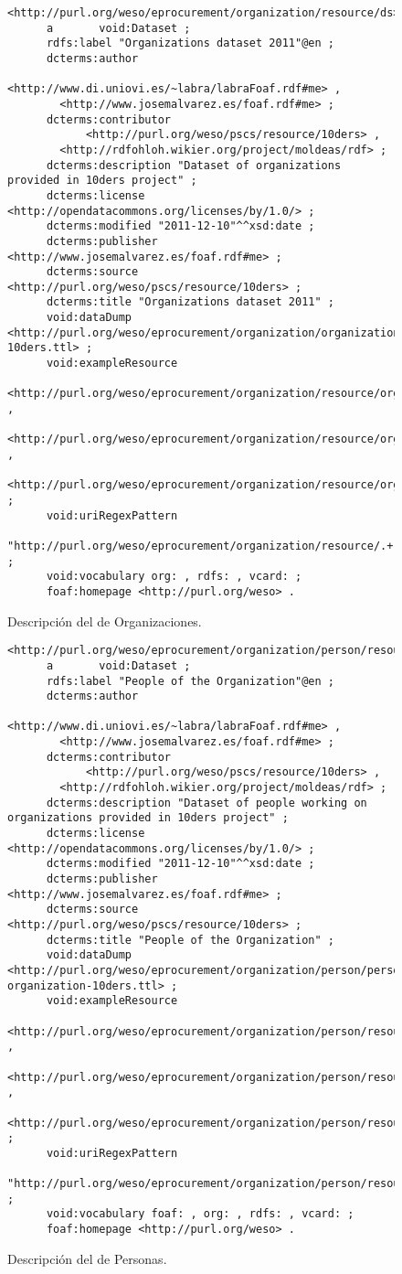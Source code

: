 \begin{figure}[!htp]
\begin{lstlisting} 
<http://purl.org/weso/eprocurement/organization/resource/ds>
      a       void:Dataset ;
      rdfs:label "Organizations dataset 2011"@en ;
      dcterms:author 
            <http://www.di.uniovi.es/~labra/labraFoaf.rdf#me> , 
	    <http://www.josemalvarez.es/foaf.rdf#me> ;
      dcterms:contributor
            <http://purl.org/weso/pscs/resource/10ders> ,
	    <http://rdfohloh.wikier.org/project/moldeas/rdf> ;
      dcterms:description "Dataset of organizations provided in 10ders project" ;
      dcterms:license <http://opendatacommons.org/licenses/by/1.0/> ;
      dcterms:modified "2011-12-10"^^xsd:date ;
      dcterms:publisher <http://www.josemalvarez.es/foaf.rdf#me> ;
      dcterms:source <http://purl.org/weso/pscs/resource/10ders> ;
      dcterms:title "Organizations dataset 2011" ;
      void:dataDump <http://purl.org/weso/eprocurement/organization/organization-10ders.ttl> ;
      void:exampleResource
        <http://purl.org/weso/eprocurement/organization/resource/org1> , 
	<http://purl.org/weso/eprocurement/organization/resource/org2> , 
	<http://purl.org/weso/eprocurement/organization/resource/org3> ;
      void:uriRegexPattern
        "http://purl.org/weso/eprocurement/organization/resource/.+" ;
      void:vocabulary org: , rdfs: , vcard: ;
      foaf:homepage <http://purl.org/weso> .
\end{lstlisting}
	\caption{Descripción del \dataset de Organizaciones.}
	\label{fig:orgs-ds}
\end{figure}
\begin{figure}[!htp]
\begin{lstlisting} 
<http://purl.org/weso/eprocurement/organization/person/resource/ds>
      a       void:Dataset ;
      rdfs:label "People of the Organization"@en ;
      dcterms:author 
            <http://www.di.uniovi.es/~labra/labraFoaf.rdf#me> , 
	    <http://www.josemalvarez.es/foaf.rdf#me> ;
      dcterms:contributor
            <http://purl.org/weso/pscs/resource/10ders> ,
	    <http://rdfohloh.wikier.org/project/moldeas/rdf> ;
      dcterms:description "Dataset of people working on organizations provided in 10ders project" ;
      dcterms:license <http://opendatacommons.org/licenses/by/1.0/> ;
      dcterms:modified "2011-12-10"^^xsd:date ;
      dcterms:publisher <http://www.josemalvarez.es/foaf.rdf#me> ;
      dcterms:source <http://purl.org/weso/pscs/resource/10ders> ;
      dcterms:title "People of the Organization" ;
      void:dataDump <http://purl.org/weso/eprocurement/organization/person/person-organization-10ders.ttl> ;
      void:exampleResource
        <http://purl.org/weso/eprocurement/organization/person/resource/p1> , 
	<http://purl.org/weso/eprocurement/organization/person/resource/p2> , 
	<http://purl.org/weso/eprocurement/organization/person/resource/p3> ;
      void:uriRegexPattern
        "http://purl.org/weso/eprocurement/organization/person/resource/.+" ;
      void:vocabulary foaf: , org: , rdfs: , vcard: ;
      foaf:homepage <http://purl.org/weso> .
\end{lstlisting}
	\caption{Descripción del \dataset de Personas.}
	\label{fig:people-ds}
\end{figure}


